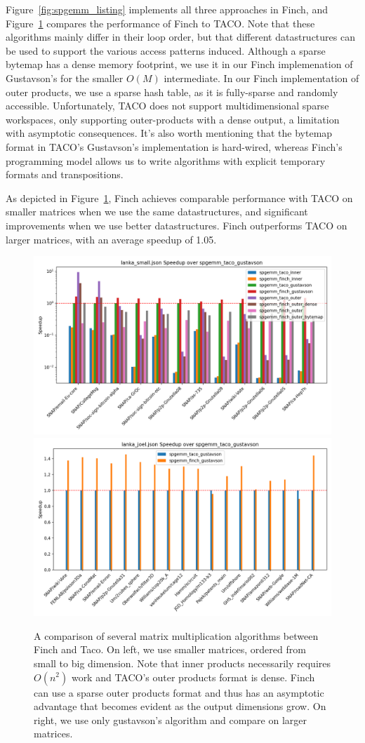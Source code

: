 Figure~\ref{fig:spgemm_listing} implements all three approaches in Finch, and Figure~\ref{fig:spgemm} compares the performance of Finch to TACO.
%
Note that these algorithms mainly differ in their loop order, but that different datastructures can be used to support the various access patterns induced.
%
Although a sparse bytemap has a dense memory footprint, we use it in our Finch implemenation of Gustavson's for the smaller $O(M)$ intermediate.
%
In our Finch implementation of outer products, we use a sparse hash table, as it is fully-sparse and randomly accessible.
%
Unfortunately, TACO does not support multidimensional sparse workspaces, only supporting outer-products with a dense output, a limitation with asymptotic consequences.
%
It's also worth mentioning that the bytemap format in TACO's Gustavson's implementation is hard-wired, whereas Finch's programming model allows us to write algorithms with explicit temporary formats and transpositions.

As depicted in Figure~\ref{fig:spgemm}, Finch achieves comparable performance with TACO on smaller matrices when we use the same datastructures, and significant improvements when we use better datastructures. Finch outperforms TACO on larger matrices, with an average speedup of 1.05. 

\begin{figure}
	\includegraphics[width=0.5\linewidth]{spgemm_small_speedup_log_scale.png}%
	\includegraphics[width=0.5\linewidth]{spgemm_joel_speedup.png}
    \vspace{-8pt}
    \caption{A comparison of several matrix multiplication algorithms between
    Finch and Taco. On left, we use smaller matrices, ordered from small to big
    dimension. Note that inner products necessarily requires $O(n^2)$ work and
    TACO's outer products format is dense. Finch can use a sparse outer products
    format and thus has an asymptotic advantage that becomes evident as the
    output dimensions grow. On right, we use only gustavson's algorithm and
    compare on larger matrices.}
    \label{fig:spgemm}
    \vspace{-12pt}
\end{figure}


